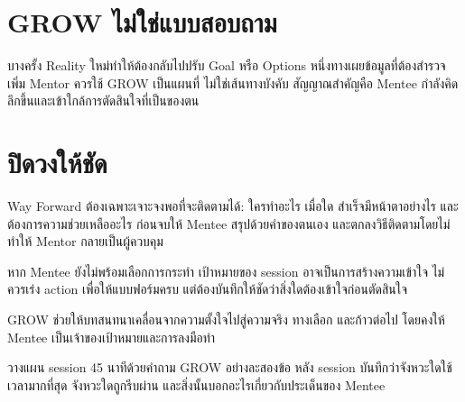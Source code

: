 \section{GROW ไม่ใช่แบบสอบถาม}
บางครั้ง Reality ใหม่ทำให้ต้องกลับไปปรับ Goal หรือ Options หนึ่งทางเผยข้อมูลที่ต้องสำรวจเพิ่ม Mentor ควรใช้ GROW เป็นแผนที่ ไม่ใช่เส้นทางบังคับ สัญญาณสำคัญคือ Mentee กำลังคิดลึกขึ้นและเข้าใกล้การตัดสินใจที่เป็นของตน

\section{ปิดวงให้ชัด}
Way Forward ต้องเฉพาะเจาะจงพอที่จะติดตามได้: ใครทำอะไร เมื่อใด สำเร็จมีหน้าตาอย่างไร และต้องการความช่วยเหลืออะไร ก่อนจบให้ Mentee สรุปด้วยคำของตนเอง และตกลงวิธีติดตามโดยไม่ทำให้ Mentor กลายเป็นผู้ควบคุม

\begin{mentornote}
หาก Mentee ยังไม่พร้อมเลือกการกระทำ เป้าหมายของ session อาจเป็นการสร้างความเข้าใจ ไม่ควรเร่ง action เพื่อให้แบบฟอร์มครบ แต่ต้องบันทึกให้ชัดว่าสิ่งใดต้องเข้าใจก่อนตัดสินใจ
\end{mentornote}

\begin{keytakeaway}
GROW ช่วยให้บทสนทนาเคลื่อนจากความตั้งใจไปสู่ความจริง ทางเลือก และก้าวต่อไป โดยคงให้ Mentee เป็นเจ้าของเป้าหมายและการลงมือทำ
\end{keytakeaway}

\begin{reflection}
วางแผน session 45 นาทีด้วยคำถาม GROW อย่างละสองข้อ หลัง session บันทึกว่าจังหวะใดใช้เวลามากที่สุด จังหวะใดถูกรีบผ่าน และสิ่งนั้นบอกอะไรเกี่ยวกับประเด็นของ Mentee
\blankline\blankline
\end{reflection}

